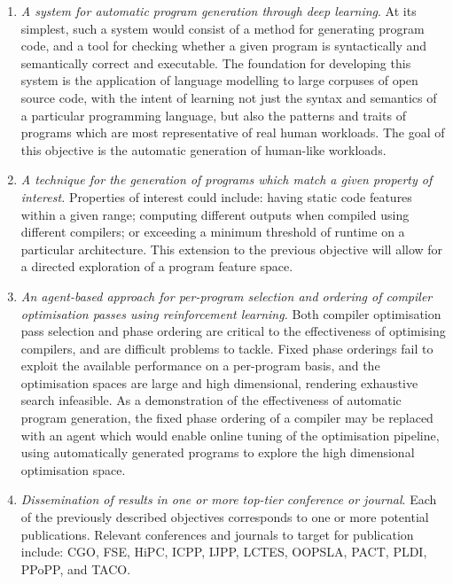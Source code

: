 \begin{enumerate}
  \item \emph{A system for automatic program generation through deep learning}. At its simplest, such a system would consist of a method for generating program code, and a tool for checking whether a given program is syntactically and semantically correct and executable. The foundation for developing this system is the application of language modelling to large corpuses of open source code, with the intent of learning not just the syntax and semantics of a particular programming language, but also the patterns and traits of programs which are most representative of real human workloads. The goal of this objective is the automatic generation of human-like workloads.
  \item \emph{A technique for the generation of programs which match a given property of interest.} Properties of interest could include: having static code features within a given range; computing different outputs when compiled using different compilers; or exceeding a minimum threshold of runtime on a particular architecture. This extension to the previous objective will allow for a directed exploration of a program feature space.
  \item \emph{An agent-based approach for per-program selection and ordering of compiler optimisation passes using reinforcement learning.} Both compiler optimisation pass selection and phase ordering are critical to the effectiveness of optimising compilers, and are difficult problems to tackle. Fixed phase orderings fail to exploit the available performance on a per-program basis, and the optimisation spaces are large and high dimensional, rendering exhaustive search infeasible. As a demonstration of the effectiveness of automatic program generation, the fixed phase ordering of a compiler may be replaced with an agent which would enable online tuning of the optimisation pipeline, using automatically generated programs to explore the high dimensional optimisation space.
  \item \emph{Dissemination of results in one or more top-tier conference or journal}. Each of the previously described objectives corresponds to one or more potential publications. Relevant conferences and journals to target for publication include: CGO, FSE, HiPC, ICPP, IJPP, LCTES, OOPSLA, PACT, PLDI, PPoPP, and TACO.
\end{enumerate}


%
%
%
